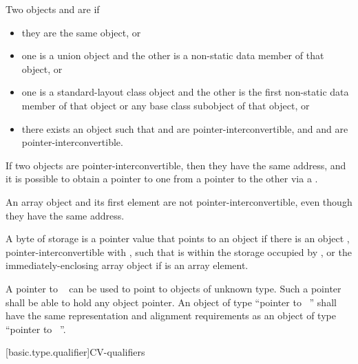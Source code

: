 \pnum
Two objects  and  are  if
\begin{itemize}
\item
they are the same object, or
\item
one is a union object and
the other is a non-static data member of that object, or
\item
one is a standard-layout class object and
the other is the first non-static data member of that object or
any base class subobject of that object, or
\item
there exists an object  such that
 and  are pointer-interconvertible, and
 and  are pointer-interconvertible.
\end{itemize}
If two objects are pointer-interconvertible,
then they have the same address,
and it is possible to obtain a pointer to one
from a pointer to the other
via a .
\begin{note}
An array object and its first element are not pointer-interconvertible,
even though they have the same address.
\end{note}

\pnum
A byte of storage 
is 
a pointer value that points to an object 
if there is an object ,
pointer-interconvertible with ,
such that  is within the storage occupied by
, or the immediately-enclosing array object
if  is an array element.

\pnum
{}%
%
A pointer to \cv{}~
can be used to point to objects of
unknown type. Such a pointer shall be able to hold any object pointer.
An object of type ``pointer to \cv{}~''
shall have the same representation and alignment
requirements as an object of type ``pointer to \cv{}~''.

[basic.type.qualifier]{CV-qualifiers}

